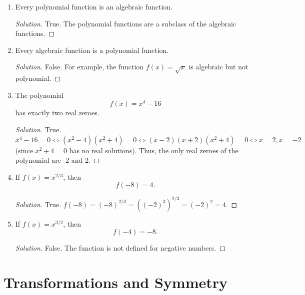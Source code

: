 \documentclass[12pt]{article}
\newenvironment{solution}{\begin{proof}[Solution]}{\end{proof}}
\begin{document}
\begin{enumerate}
\begin{enumerate}
				\item Every polynomial function is an algebraic function.
				\begin{solution}
					True. The polynomial functions are a subclass of the algebraic functions.
				\end{solution}
				\item Every algebraic function is a polynomial function. 
				\begin{solution}
					False. For example, the function $f(x)=\sqrt{x}$ is algebraic but not polynomial.
				\end{solution}
				
				\item The polynomial
				$$
				f(x)=x^4-16
				$$
				has exactly two real zeroes.
				\begin{solution}
					True. $x^4-16=0\iff (x^2-4)(x^2+4)=0\iff (x-2)(x+2)(x^2+4)=0\iff x=2,x=-2$ (since $x^2+4=0$ has no real solutions). Thus, the only real zeroes of the polynomial are -2 and 2.
				\end{solution}
				\item If $f(x)=x^{2/3}$, then
				$$
				f(-8)=4.
				$$
				\begin{solution}
					True. $f(-8)=(-8)^{2/3}=((-2)^3)^{2/3}=(-2)^2=4$.
				\end{solution}
				\item If $f(x)=x^{3/2}$, then
				$$
				f(-4)=-8.
				$$
				\begin{solution}
					False. The function is not defined for negative numbers.
				\end{solution}
		\end{enumerate}
		
		
	\end{enumerate}
	\newpage
		\section{Transformations and Symmetry}
	
\end{document}
